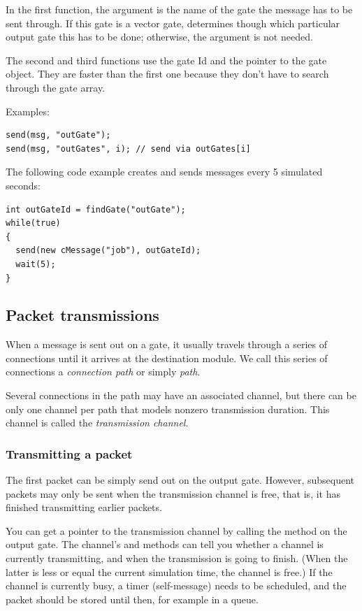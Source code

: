 In the first function, the argument  is the name of
the gate the message has to be sent through. If this gate is
a vector gate,  determines though which particular output
gate this has to be done; otherwise, the  argument is not
needed.

The second and third functions use the gate Id and the pointer to the gate
object. They are faster than the first one because they don't have to
search through the gate array.

Examples:

\begin{verbatim}
send(msg, "outGate");
send(msg, "outGates", i); // send via outGates[i]
\end{verbatim}

The following code example creates and sends messages
every 5 simulated seconds:

\begin{verbatim}
int outGateId = findGate("outGate");
while(true)
{
  send(new cMessage("job"), outGateId);
  wait(5);
}
\end{verbatim}


\subsection{Packet transmissions}
\label{ch:simple-modules:packet-transmission}

When a message is sent out on a gate, it usually travels through
a series of connections until it arrives at the destination module.
We call this series of connections a \textit{connection path} or
simply \textit{path}.

Several connections in the path may have an associated channel,
but there can be only one channel per path that models nonzero
transmission duration. This channel is called the
\textit{transmission channel}.

\subsubsection{Transmitting a packet}

The first packet can be simply send out on the output gate. However,
subsequent packets may only be sent when the transmission channel
is free, that is, it has finished transmitting earlier packets.

You can get a pointer to the transmission channel by calling the
 method on the output gate.
The channel's  and 
methods can tell you whether a channel is currently transmitting,
and when the transmission is going to finish. (When the latter is
less or equal the current simulation time, the channel is free.)
If the channel is currently busy, a timer (self-message) needs to
be scheduled, and the packet should be stored until then, for example
in a queue.

